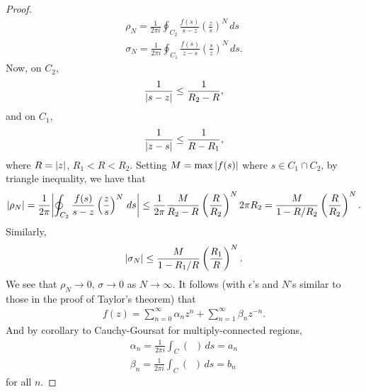 \documentclass{article}
\theoremstyle{definition}
\newcommand{\f}[2]{\frac{#1}{#2}}
\newcommand{\lp}{\left(}
\newcommand{\rp}{\right)}
\newcommand{\nn}{\nonumber}
\begin{document}
\begin{proof}
\begin{align}
	\rho_N = \f{1}{2\pi i}\oint_{C_2} \f{f(s)}{s-z}\lp \f{z}{s} \rp^N\,ds\\
	\sigma_N = \f{1}{2\pi i}\oint_{C_1} \f{f(s)}{z-s}\lp \f{s}{z} \rp^N\,ds.
	\end{align}
	Now, on $C_2$,
	\begin{align}
	\f{1}{\abs{s-z}} \leq \f{1}{R_2 - R},
	\end{align}
	and on $C_1$, 
	\begin{align}
	\f{1}{\abs{z-s}} \leq \f{1}{R - R_1},
	\end{align}
	where $R = \abs{z}$, $R_1< R <R_2$. Setting $M = \max\abs{f(s)}$ where $s \in C_1 \cap C_2$, by triangle inequality, we have that
	\begin{align}
	\abs{\rho_N} = \f{1}{2\pi} \abs{\oint_{C_2}\f{f(s)}{s-z}\lp \f{z}{s} \rp^N\,ds} \leq \f{1}{2\pi }\f{M}{R_2 - R}\lp \f{R}{R_2} \rp^N 2\pi R_2 = \f{M}{1 - R/R_2}\lp \f{R}{R_2} \rp^N.
	\end{align}
	Similarly,
	\begin{align}
	\abs{\sigma_N} \leq \f{M}{1 - R_1/R}\lp \f{R_1}{R} \rp^N.
	\end{align}
	We see that $\rho_N \to 0$, $\sigma \to 0$ as $N \to \infty$. It follows (with $\epsilon$'s and $N$'s similar to those in the proof of Taylor's theorem) that
	\begin{align}
	f(z) = \sum^\infty_{n=0}\alpha_n z^n + \sum^\infty_{n=1} \beta_n z^{-n}.
	\end{align}
	And by corollary to Cauchy-Goursat for multiply-connected regions, 
	\begin{align}
	\alpha_n = \f{1}{2\pi i}\int_C (\,\,\,) \,ds = a_n\nn\\
	\beta_n = \f{1}{2\pi i}\int_C (\,\,\,) \,ds = b_n
	\end{align}
	for all $n$. 
\end{proof}
\end{document}
